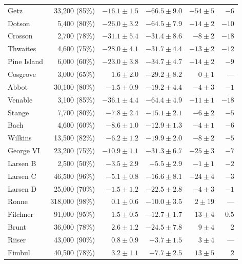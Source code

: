 \begin{footnotesize}
\begin{longtable}{lrrrrr}
Getz 	        & 33,200    (85\%) & $-16.1 \pm 1.5$ & $-66.5 \pm 9.0 $ & $-54  \pm 5 $ & $-6  $ \\
Dotson  	& 5,400     (80\%) & $-26.0 \pm 3.2$ & $-64.5 \pm 7.9 $ & $-14  \pm 2 $ & $-10 $ \\
Crosson 	& 2,700     (78\%) & $-31.1 \pm 5.4$ & $-31.4 \pm 8.6 $ & $-8   \pm 2 $ & $-18 $ \\
Thwaites 	& 4,600     (75\%) & $-28.0 \pm 4.1$ & $-31.7 \pm 4.4 $ & $-13  \pm 2 $ & $-12 $ \\
Pine Island 	& 6,000     (60\%) & $-23.0 \pm 3.8$ & $-34.7 \pm 4.7 $ & $-14  \pm 2 $ & $-9  $ \\
Cosgrove 	& 3,000     (65\%) & $1.6   \pm 2.0$ & $-29.2 \pm 8.2 $ & $0    \pm 1 $ &  ---   \\
Abbot 	        & 30,100    (80\%) & $-1.5  \pm 0.9$ & $-19.2 \pm 4.4 $ & $-4   \pm 3 $ & $-1  $ \\
Venable 	& 3,100     (85\%) & $-36.1 \pm 4.4$ & $-64.4 \pm 4.9 $ & $-11  \pm 1 $ & $-18 $ \\
Stange 	        & 7,700     (80\%) & $-7.8  \pm 2.4$ & $-15.1 \pm 2.1 $ & $-6   \pm 2 $ & $-5  $ \\
Bach 	        & 4,600     (60\%) & $-8.6  \pm 1.0$ & $-12.9 \pm 1.3 $ & $-4   \pm 1 $ & $-6  $ \\
Wilkins 	& 13,500    (82\%) & $-6.2  \pm 1.2$ & $-19.9 \pm 2.0 $ & $-8   \pm 2 $ & $-5  $ \\
George VI 	& 23,200    (75\%) & $-10.9 \pm 1.1$ & $-31.3 \pm 6.7 $ & $-25  \pm 3 $ & $-7  $ \\
Larsen B 	& 2,500     (50\%) & $-3.5  \pm 2.9$ & $-5.5  \pm 2.9 $ & $-1   \pm 1 $ & $-2  $ \\
Larsen C 	& 46,500    (96\%) & $-5.1  \pm 0.8$ & $-16.6 \pm 8.1 $ & $-24  \pm 4 $ & $-3  $ \\
Larsen D 	& 25,000    (70\%) & $-1.5  \pm 1.2$ & $-22.5 \pm 2.8 $ & $-4   \pm 3 $ & $-1  $ \\
Ronne 	        & 318,000   (98\%) & $0.1   \pm 0.6$ & $-10.0 \pm 3.5 $ & $2    \pm 19$ &  ---   \\
Filchner 	& 91,000    (95\%) & $1.5   \pm 0.5$ & $-12.7 \pm 1.7 $ & $13   \pm 4 $ & $0.5 $ \\
Brunt 	        & 36,000    (78\%) & $2.6   \pm 1.2$ & $-24.5 \pm 7.8 $ & $9    \pm 4 $ & $2   $ \\
Riiser  	& 43,000    (90\%) & $0.8   \pm 0.9$ & $-3.7  \pm 1.5 $ & $3    \pm 4 $ &  ---   \\
Fimbul  	& 40,500    (78\%) & $3.2   \pm 1.1$ & $-7.7  \pm 2.5 $ & $13   \pm 5 $ & $2   $ \\

\end{longtable}
\end{footnotesize}
